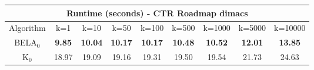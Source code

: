 \begin{tabular}{c|cccccccc}\toprule
\multicolumn{9}{c}{Runtime (seconds) - CTR Roadmap dimacs}\\ \midrule
Algorithm & k=1 & k=10 & k=50 & k=100 & k=500 & k=1000 & k=5000 & k=10000 \\ \midrule
BELA$_0$ & \textbf{9.85} & \textbf{10.04} & \textbf{10.17} & \textbf{10.17} & \textbf{10.48} & \textbf{10.52} & \textbf{12.01} & \textbf{13.85} \\
K$_0$ & 18.97 & 19.09 & 19.16 & 19.31 & 19.50 & 19.54 & 21.73 & 24.63 \\ \bottomrule 
\end{tabular}
